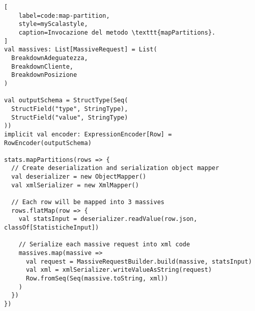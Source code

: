 \begin{lstlisting}[
    label=code:map-partition,
    style=myScalastyle,
    caption=Invocazione del metodo \texttt{mapPartitions}.
]
val massives: List[MassiveRequest] = List(
  BreakdownAdeguatezza,
  BreakdownCliente,
  BreakdownPosizione
)

val outputSchema = StructType(Seq(
  StructField("type", StringType),
  StructField("value", StringType)
))
implicit val encoder: ExpressionEncoder[Row] = RowEncoder(outputSchema)

stats.mapPartitions(rows => {
  // Create deserialization and serialization object mapper
  val deserializer = new ObjectMapper()
  val xmlSerializer = new XmlMapper()

  // Each row will be mapped into 3 massives
  rows.flatMap(row => {
    val statsInput = deserializer.readValue(row.json, classOf[StatisticheInput])

    // Serialize each massive request into xml code
    massives.map(massive =>
      val request = MassiveRequestBuilder.build(massive, statsInput)
      val xml = xmlSerializer.writeValueAsString(request)
      Row.fromSeq(Seq(massive.toString, xml))
    )
  })
})
\end{lstlisting}